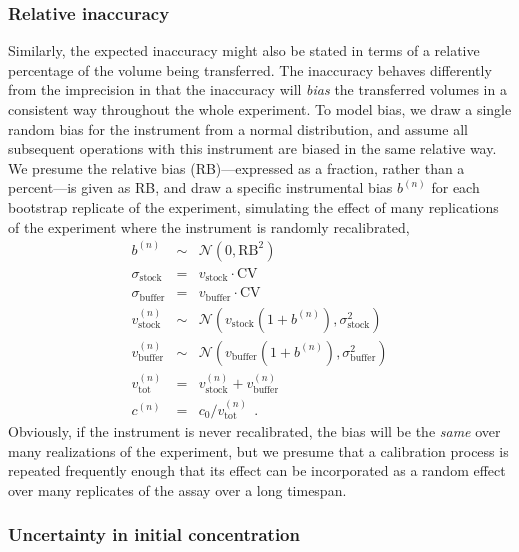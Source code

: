 \documentclass[aps,pre,twocolumn,nofootinbib,superscriptaddress,linenumbers]{revtex4-1}
\begin{document}
\subsubsection*{Relative inaccuracy}

Similarly, the expected inaccuracy might also be stated in terms of a relative percentage of the volume being transferred.
The inaccuracy behaves differently from the imprecision in that the inaccuracy will \emph{bias} the transferred volumes in a consistent way throughout the whole experiment.
To model bias, we draw a single random bias for the instrument from a normal distribution, and assume all subsequent operations with this instrument are biased in the same relative way.
We presume the relative bias (RB)---expressed as a fraction, rather than a percent---is given as RB, and draw a specific instrumental bias $b^{(n)}$ for each bootstrap replicate of the experiment, simulating the effect of many replications of the experiment where the instrument is randomly recalibrated,
\begin{eqnarray}
b^{(n)} &\sim& \mathcal{N}(0, \mathrm{RB}^2) \nonumber \\
\sigma_\mathrm{stock} &=& v_\mathrm{stock} \cdot \mathrm{CV} \nonumber \\
\sigma_\mathrm{buffer} &=& v_\mathrm{buffer} \cdot \mathrm{CV} \nonumber \\
v_\mathrm{stock}^{(n)} &\sim& \mathcal{N}(v_\mathrm{stock} (1 + b^{(n)}) , \sigma_\mathrm{stock}^2) \nonumber \\
v_\mathrm{buffer}^{(n)} &\sim& \mathcal{N}(v_\mathrm{buffer} (1 + b^{(n)}), \sigma_\mathrm{buffer}^2) \nonumber \\
v_\mathrm{tot}^{(n)} &=& v_\mathrm{stock}^{(n)} + v_\mathrm{buffer}^{(n)} \nonumber \\
c^{(n)} &=& c_0 / v_\mathrm{tot}^{(n)} \:\: . \label{equation:relative-inaccuracy-mixing}
\end{eqnarray}
Obviously, if the instrument is never recalibrated, the bias will be the \emph{same} over many realizations of the experiment, but we presume that a calibration process is repeated frequently enough that its effect can be incorporated as a random effect over many replicates of the assay over a long timespan.

\subsubsection*{Uncertainty in initial concentration}
\end{document}
